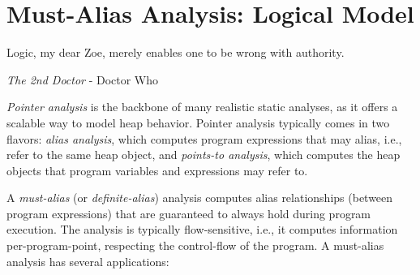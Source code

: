 \chapter{Must-Alias Analysis: Logical Model}\label{chapter:must-logic}

\epigraph{Logic, my dear Zoe, merely enables one to be wrong with authority.}{\textit{The 2nd Doctor} - Doctor Who}


\emph{Pointer analysis} is the backbone of many realistic static analyses, as
it offers a scalable way to model heap behavior.  Pointer analysis typically
comes in two flavors: \emph{alias analysis}, which computes program expressions
that may alias, i.e., refer to the same heap object, and \emph{points-to
analysis}, which computes the heap objects that program variables and
expressions may refer to.

A \emph{must-alias} (or \emph{definite-alias}) analysis computes alias
relationships (between program expressions) that are guaranteed to always hold
during program execution. The analysis is typically flow-sensitive, i.e., it
computes information per-program-point, respecting the control-flow of the
program. A must-alias analysis has several applications:

